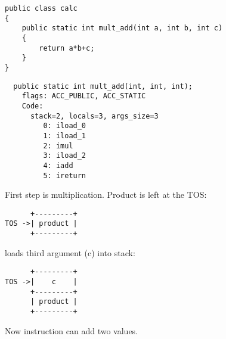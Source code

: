 \begin{lstlisting}
public class calc
{
	public static int mult_add(int a, int b, int c)
	{
		return a*b+c;
	}
}
\end{lstlisting}

\begin{lstlisting}
  public static int mult_add(int, int, int);
    flags: ACC_PUBLIC, ACC_STATIC
    Code:
      stack=2, locals=3, args_size=3
         0: iload_0       
         1: iload_1       
         2: imul          
         3: iload_2       
         4: iadd          
         5: ireturn       
\end{lstlisting}

First step is multiplication. Product is left at the \ac{TOS}:

\begin{lstlisting}
      +---------+
TOS ->| product |
      +---------+
\end{lstlisting}

 loads third argument (c) into stack:

\begin{lstlisting}
      +---------+
TOS ->|    c    |
      +---------+
      | product |
      +---------+
\end{lstlisting}

Now  instruction can add two values.

